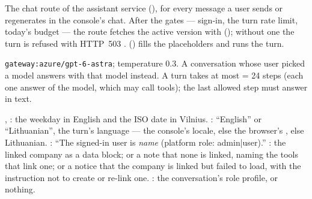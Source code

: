  The chat route  of the assistant
service (), for every message a user sends or regenerates in the
console's chat. After the gates --- sign-in, the turn rate limit, today's budget --- the route
fetches the active version with  (); without one
the turn is refused with HTTP~503 . 
() fills the placeholders and  runs the turn.

 \texttt{gateway:azure/gpt-6-astra}; temperature 0.3. A
conversation whose user picked a model answers with that model instead. A turn takes at most
 = 24 steps (each one answer of the model, which may call tools); the last
allowed step must answer in text.

 , : the weekday in English and the
ISO date in Vilnius. : \enquote{English} or \enquote{Lithuanian}, the
turn's language --- the console's locale, else the browser's , else
Lithuanian. : \enquote{The signed-in user is \textit{name} (platform role:
admin|user).} : the linked company as a data block; or a note that
none is linked, naming the tools that link one; or a notice that the company is linked but
failed to load, with the instruction not to create or re-link one. : the
conversation's role profile, or nothing.

